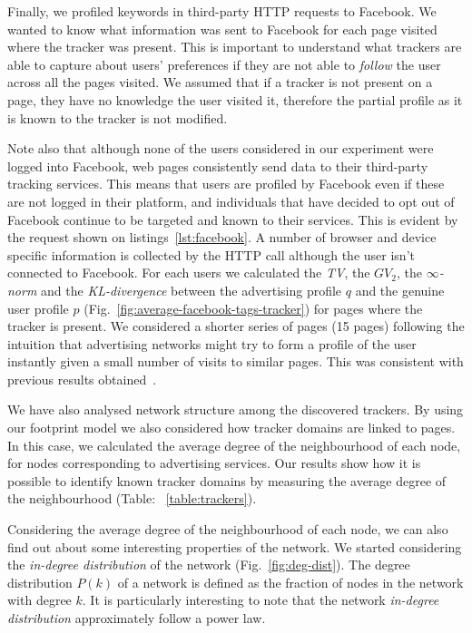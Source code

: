 Finally, we profiled keywords in third-party HTTP requests to Facebook. We wanted to know what information was sent to Facebook for each page visited where the tracker was present. This is important to understand what trackers are able to capture about users' preferences if they are not able to \emph{follow} the user across all the pages visited. We assumed that if a tracker is not present on a page, they have no knowledge the user visited it, therefore the partial profile as it is known to the tracker is not modified.

Note also that although none of the users considered in our experiment were logged into Facebook, web pages consistently send data to their third-party tracking services. This means that users are profiled by Facebook even if these are not logged in their platform, and individuals that have decided to opt out of Facebook continue to be targeted and known to their services. This is evident by the request shown on listings~\ref{lst:facebook}. A number of browser and device specific information is collected by the HTTP call although the user isn't connected to Facebook. For each users we calculated the \emph{TV}, the \emph{$GV_2$}, the \emph{$\infty$-norm} and the \emph{KL-divergence} between the advertising profile $q$ and the genuine user profile $p$ (Fig.~\ref{fig:average-facebook-tags-tracker}) for pages where the tracker is present. We considered a shorter series of pages (15 pages) following the intuition that advertising networks might try to form a profile of the user instantly given a small number of visits to similar pages. This was consistent with previous results obtained~\cite{puglisi2015you}.

We have also analysed network structure among the discovered trackers. By using our footprint model we also considered how tracker domains are linked to pages. In this case, we calculated the average degree of the neighbourhood of each node, for nodes corresponding to advertising services. Our results show how it is possible to identify known tracker domains by measuring the average degree of the neighbourhood (Table: ~\ref{table:trackers}).

Considering the average degree of the neighbourhood of each node, we can also find out about some interesting properties of the network. We started considering the \emph{in-degree distribution} of the network (Fig.~\ref{fig:deg-dist}). The degree distribution $P(k)$ of a network is defined as the fraction of nodes in the network with degree $k$. It is particularly interesting to note that the network \emph{in-degree distribution} approximately follow a power law.

